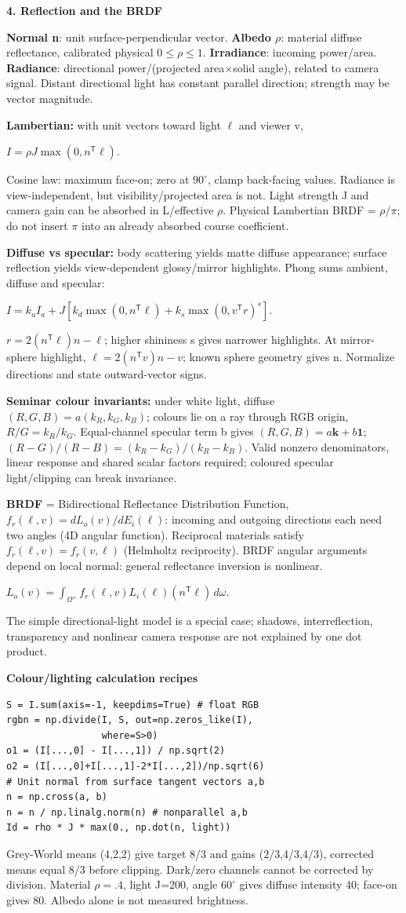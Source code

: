 \documentclass[a4paper]{article}
\newcommand{\key}[1]{\textbf{#1}}
\newcommand{\Topic}[1]{\par\vspace{1.7pt}\noindent
  {\fontsize{7.7}{8.0}\selectfont\bfseries #1}\par\vspace{0.3pt}}
\newcommand{\eq}[1]{\par\noindent\mbox{\(\displaystyle #1\)}\par}
\newcommand{\trans}{^{\mathsf T}}
\newcounter{sheet}
\newcounter{sheetcolumn}
\newlength{\colwidth}
\newenvironment{sheetcol}[1][7.0]{\stepcounter{sheetcolumn}
  \begin{lrbox}{\columnbox}\begin{minipage}[t]{\colwidth}\vspace{0pt}
  \fontsize{#1}{\dimexpr#1pt+0.6pt\relax}\selectfont}
  {\end{minipage}\end{lrbox}
  \typeout{CV1COL|\thesheet|\thesheetcolumn|\the\dimexpr\ht\columnbox+\dp\columnbox\relax}
  \usebox{\columnbox}\ignorespacesafterend}
\begin{document}
\begin{sheetcol}
\Topic{4. Reflection and the BRDF}
\key{Normal n}: unit surface-perpendicular vector. \key{Albedo \(\rho\)}: material diffuse reflectance, calibrated physical \(0\le\rho\le1\). \key{Irradiance}: incoming power/area. \key{Radiance}: directional power/(projected area\(\times\)solid angle), related to camera signal. Distant directional light has constant parallel direction; strength may be vector magnitude.

\key{Lambertian:} with unit vectors toward light \(\ell\) and viewer v,
\eq{I=\rho J\max(0,n\trans\ell).}
Cosine law: maximum face-on; zero at \(90^\circ\), clamp back-facing values. Radiance is view-independent, but visibility/projected area is not. Light strength J and camera gain can be absorbed in L/effective \(\rho\). Physical Lambertian BRDF = \(\rho/\pi\); do not insert \(\pi\) into an already absorbed course coefficient.

\key{Diffuse vs specular:} body scattering yields matte diffuse appearance; surface reflection yields view-dependent glossy/mirror highlights. Phong sums ambient, diffuse and specular:
\eq{I=k_aI_a+J[k_d\max(0,n\trans\ell)
 +k_s\max(0,v\trans r)^s].}
\(r=2(n\trans\ell)n-\ell\); higher shininess s gives narrower highlights. At mirror-sphere highlight, \(\ell=2(n\trans v)n-v\); known sphere geometry gives n. Normalize directions and state outward-vector signs.

\key{Seminar colour invariants:} under white light, diffuse \((R,G,B)=a(k_R,k_G,k_B)\); colours lie on a ray through RGB origin, \(R/G=k_R/k_G\). Equal-channel specular term b gives \((R,G,B)=a\mathbf k+b\mathbf1\); \((R-G)/(R-B)=(k_R-k_G)/(k_R-k_B)\). Valid nonzero denominators, linear response and shared scalar factors required; coloured specular light/clipping can break invariance.

\key{BRDF} = Bidirectional Reflectance Distribution Function, \(f_r(\ell,v)=dL_o(v)/dE_i(\ell)\): incoming and outgoing directions each need two angles (4D angular function). Reciprocal materials satisfy \(f_r(\ell,v)=f_r(v,\ell)\) (Helmholtz reciprocity). BRDF angular arguments depend on local normal: general reflectance inversion is nonlinear.
\eq{L_o(v)=\int_{\Omega^+}f_r(\ell,v)L_i(\ell)
 (n\trans\ell)\,d\omega.}
The simple directional-light model is a special case; shadows, interreflection, transparency and nonlinear camera response are not explained by one dot product.

\Topic{Colour/lighting calculation recipes}
\begin{lstlisting}
S = I.sum(axis=-1, keepdims=True) # float RGB
rgbn = np.divide(I, S, out=np.zeros_like(I),
                 where=S>0)
o1 = (I[...,0] - I[...,1]) / np.sqrt(2)
o2 = (I[...,0]+I[...,1]-2*I[...,2])/np.sqrt(6)
# Unit normal from surface tangent vectors a,b
n = np.cross(a, b)
n = n / np.linalg.norm(n) # nonparallel a,b
Id = rho * J * max(0., np.dot(n, light))
\end{lstlisting}
Grey-World means (4,2,2) give target 8/3 and gains (2/3,4/3,4/3), corrected means equal 8/3 before clipping. Dark/zero channels cannot be corrected by division. Material \(\rho=.4\), light J=200, angle \(60^\circ\) gives diffuse intensity 40; face-on gives 80. Albedo alone is not measured brightness.


\end{sheetcol}
\end{document}
